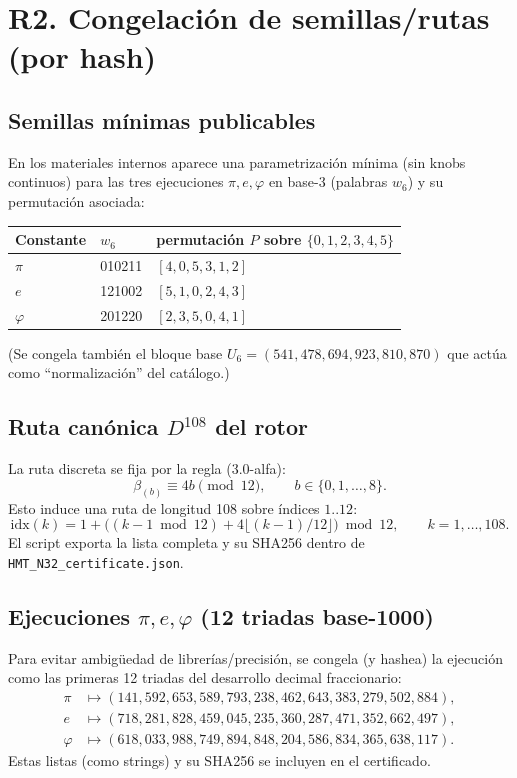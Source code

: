 \documentclass[11pt]{article}
\begin{document}
\section{R2. Congelación de semillas/rutas (por hash)}

\subsection{Semillas mínimas publicables}
En los materiales internos aparece una parametrización mínima (sin knobs continuos) para las tres ejecuciones $\pi,e,\varphi$ en base-3 (palabras $w_6$) y su permutación asociada:
\begin{center}
\begin{tabular}{@{}l l l@{}}
\toprule
Constante & $w_6$ & permutación $P$ sobre $\{0,1,2,3,4,5\}$\\
\midrule
$\pi$ & 010211 & $[4,0,5,3,1,2]$\\
$e$ & 121002 & $[5,1,0,2,4,3]$\\
$\varphi$ & 201220 & $[2,3,5,0,4,1]$\\
\bottomrule
\end{tabular}
\end{center}
(Se congela también el bloque base $U_6=(541,478,694,923,810,870)$ que actúa como ``normalización'' del catálogo.)

\subsection{Ruta canónica $D^{108}$ del rotor}
La ruta discreta se fija por la regla (3.0-alfa):
\[
\beta_{(b)}\equiv 4b\pmod{12},\qquad b\in\{0,1,\dots,8\}.
\]
Esto induce una ruta de longitud 108 sobre índices $1..12$:
\[
\mathrm{idx}(k)=1+\bigl((k-1\bmod 12)+4\lfloor (k-1)/12\rfloor\bigr)\bmod 12,\qquad k=1,\dots,108.
\]
El script exporta la lista completa y su SHA256 dentro de \texttt{HMT\_N32\_certificate.json}.

\subsection{Ejecuciones $\pi,e,\varphi$ (12 triadas base-1000)}
Para evitar ambigüedad de librerías/precisión, se congela (y hashea) la ejecución como las primeras 12 triadas del desarrollo decimal fraccionario:
\begin{align}
\pi &\mapsto (141,592,653,589,793,238,462,643,383,279,502,884),\\
 e &\mapsto (718,281,828,459,045,235,360,287,471,352,662,497),\\
\varphi &\mapsto (618,033,988,749,894,848,204,586,834,365,638,117).
\end{align}
Estas listas (como strings) y su SHA256 se incluyen en el certificado.
\end{document}

